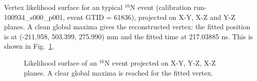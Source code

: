 

Vertex likelihood surface for an typical {$^{16}$}N event (calibration run-100934\_s000\_p001, event GTID = 61836), projected on X-Y, X-Z and Y-Z planes. A clean global maxima gives the reconstructed vertex: the fitted position is at (-211.958, 503.399, 275.990) mm and the fitted time at 217.03885 ns. This is shown in Fig.~\ref{likelihoodSurface}. 

\begin{figure}
	\centering
	\caption{Likelihood surface of an {$^{16}$}N event projected on X-Y, Y-Z, X-Z planes. A clear global maxima is reached for the fitted vertex.}
	\label{likelihoodSurface}
\end{figure}


